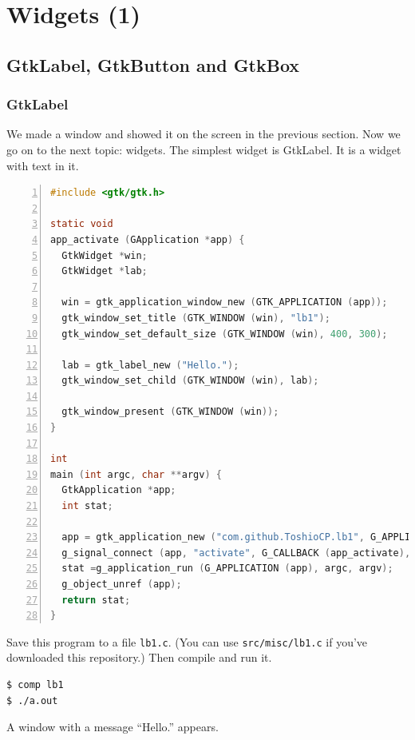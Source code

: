\section{Widgets (1)}\label{widgets-1}

\subsection{GtkLabel, GtkButton and
GtkBox}\label{gtklabel-gtkbutton-and-gtkbox}

\subsubsection{GtkLabel}\label{gtklabel}

We made a window and showed it on the screen in the previous section.
Now we go on to the next topic: widgets. The simplest widget is
GtkLabel. It is a widget with text in it.

\begin{lstlisting}[language=C, numbers=left]
#include <gtk/gtk.h>

static void
app_activate (GApplication *app) {
  GtkWidget *win;
  GtkWidget *lab;

  win = gtk_application_window_new (GTK_APPLICATION (app));
  gtk_window_set_title (GTK_WINDOW (win), "lb1");
  gtk_window_set_default_size (GTK_WINDOW (win), 400, 300);

  lab = gtk_label_new ("Hello.");
  gtk_window_set_child (GTK_WINDOW (win), lab);

  gtk_window_present (GTK_WINDOW (win));
}

int
main (int argc, char **argv) {
  GtkApplication *app;
  int stat;

  app = gtk_application_new ("com.github.ToshioCP.lb1", G_APPLICATION_DEFAULT_FLAGS);
  g_signal_connect (app, "activate", G_CALLBACK (app_activate), NULL);
  stat =g_application_run (G_APPLICATION (app), argc, argv);
  g_object_unref (app);
  return stat;
}
\end{lstlisting}

Save this program to a file \passthrough{\lstinline!lb1.c!}. (You can
use \passthrough{\lstinline!src/misc/lb1.c!} if you've downloaded this
repository.) Then compile and run it.

\begin{lstlisting}
$ comp lb1
$ ./a.out
\end{lstlisting}

A window with a message ``Hello.'' appears.

